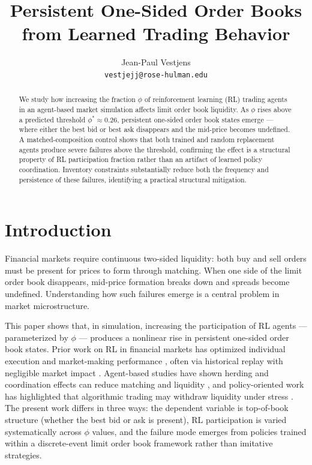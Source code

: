 \documentclass[sigconf]{acmart}
\title{Persistent One-Sided Order Books from Learned Trading Behavior}
\author{Jean-Paul Vestjens \\ \texttt{vestjejj@rose-hulman.edu}}
\date{}
\begin{document}
\begin{abstract}
We study how increasing the fraction $\phi$ of reinforcement learning (RL) trading agents in an agent-based market simulation affects limit order book liquidity. As $\phi$ rises above a predicted threshold $\phi^* \approx 0.26$, persistent one-sided order book states emerge — where either the best bid or best ask disappears and the mid-price becomes undefined. A matched-composition control shows that both trained and random replacement agents produce severe failures above the threshold, confirming the effect is a structural property of RL participation fraction rather than an artifact of learned policy coordination. Inventory constraints substantially reduce both the frequency and persistence of these failures, identifying a practical structural mitigation.
\end{abstract}

\maketitle
\hypersetup{hidelinks}

\section{Introduction}

Financial markets require continuous two-sided liquidity: both buy and sell orders must be present for prices to form through matching. When one side of the limit order book disappears, mid-price formation breaks down and spreads become undefined. Understanding how such failures emerge is a central problem in market microstructure.

This paper shows that, in simulation, increasing the participation of RL agents — parameterized by $\phi$ — produces a nonlinear rise in persistent one-sided order book states. Prior work on RL in financial markets has optimized individual execution and market-making performance \cite{spooner2018,nevmyvaka2006}, often via historical replay with negligible market impact \cite{balch2019}. Agent-based studies have shown herding and coordination effects can reduce matching and liquidity \cite{lussange2024}, and policy-oriented work has highlighted that algorithmic trading may withdraw liquidity under stress \cite{farmer2009,boe2018,imf2023}. The present work differs in three ways: the dependent variable is top-of-book structure (whether the best bid or ask is present), RL participation is varied systematically across $\phi$ values, and the failure mode emerges from policies trained within a discrete-event limit order book framework \cite{byrd2020} rather than imitative strategies.
\end{document}

